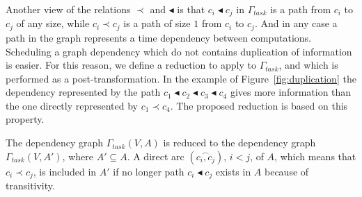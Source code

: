Another view of the relations $\prec$ and $\blacktriangleleft$ is that $c_i\blacktriangleleft c_j$ in $\Gamma_{task}$ is a path from $c_i$ to $c_j$ of any size, while $c_i \prec c_j$ is a path of size $1$ from $c_i$ to $c_j$. And in any case a path in the graph represents a time dependency between computations. Scheduling a graph dependency which do not contains duplication of information is easier. For this reason, we define a reduction to apply to $\Gamma_{task}$, and which is performed as a post-transformation. In the example of Figure~\ref{fig:duplication} the dependency represented by the path $c_1 \blacktriangleleft c_2 \blacktriangleleft c_3 \blacktriangleleft c_4$ gives more information than the one directly represented by $c_1 \prec c_4$. The proposed reduction is based on this property.

\begin{mydef}
The dependency graph $\Gamma_{task}(V,A)$ is reduced to the dependency graph $\Gamma_{task}(V,A')$, where $A' \subseteq A$. A direct arc $(\overset{\frown}{c_i,c_j})$, $i<j$, of $A$, which means that $c_i \prec c_j$, is included in $A'$ if no longer path $c_i \blacktriangleleft c_j$ exists in $A$ because of transitivity.
\end{mydef}





